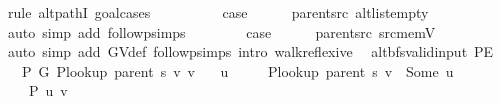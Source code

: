 \begin{isabellebody}
%
\endisadelimproof
%
\isatagproof
{}\isamarkupfalse%
\ {\isacharparenleft}{\kern0pt}rule\ alt{\isacharunderscore}{\kern0pt}pathI{\isacharcomma}{\kern0pt}\ goal{\isacharunderscore}{\kern0pt}cases{\isacharparenright}{\kern0pt}\isanewline
\ \ \isamarkupfalse%
\ {}\isanewline
\ \ \isamarkupfalse%
\ \isamarkupfalse%
\ {\isacharquery}{\kern0pt}case\isanewline
\ \ \ \ \isamarkupfalse%
\ parent{\isacharunderscore}{\kern0pt}src\ alt{\isacharunderscore}{\kern0pt}list{\isacharunderscore}{\kern0pt}empty\isanewline
\ \ \ \ \isamarkupfalse%
\ {\isacharparenleft}{\kern0pt}auto\ simp\ add{\isacharcolon}{\kern0pt}\ follow{\isacharunderscore}{\kern0pt}psimps{\isacharparenright}{\kern0pt}\isanewline
{}\isamarkupfalse%
\isanewline
\ \ \isamarkupfalse%
\ {}\isanewline
\ \ \isamarkupfalse%
\ {\isacharquery}{\kern0pt}case\isanewline
\ \ \ \ \isamarkupfalse%
\ parent{\isacharunderscore}{\kern0pt}src\ src{\isacharunderscore}{\kern0pt}mem{\isacharunderscore}{\kern0pt}V\isanewline
\ \ \ \ \isamarkupfalse%
\ {\isacharparenleft}{\kern0pt}auto\ simp\ add{\isacharcolon}{\kern0pt}\ G{\isachardot}{\kern0pt}V{\isacharunderscore}{\kern0pt}def\ follow{\isacharunderscore}{\kern0pt}psimps\ intro{\isacharcolon}{\kern0pt}\ walk{\isacharunderscore}{\kern0pt}reflexive{\isacharparenright}{\kern0pt}\isanewline
{}\isamarkupfalse%
%
\endisatagproof
{\isafoldproof}%
%
\isadelimproof
\isanewline
%
\endisadelimproof
%
\isadeliminvisible
\isanewline
%
\endisadeliminvisible
%
\isataginvisible
{}\isamarkupfalse%
\ {\isacharparenleft}{\kern0pt}\ alt{\isacharunderscore}{\kern0pt}bfs{\isacharunderscore}{\kern0pt}valid{\isacharunderscore}{\kern0pt}input{\isacharparenright}{\kern0pt}\ P{\isacharprime}{\kern0pt}E{\isacharcolon}{\kern0pt}\isanewline
\ \ \ {\isachardoublequoteopen}P{\isacharprime}{\kern0pt}\ G{}\ {\isacharparenleft}{\kern0pt}P{\isacharunderscore}{\kern0pt}lookup\ {\isacharparenleft}{\kern0pt}parent\ s{\isacharparenright}{\kern0pt}\ v{\isacharparenright}{\kern0pt}\ v{\isachardoublequoteclose}\isanewline
\ \ \ u\ \isanewline
\ \ \ \ {\isachardoublequoteopen}P{\isacharunderscore}{\kern0pt}lookup\ {\isacharparenleft}{\kern0pt}parent\ s{\isacharparenright}{\kern0pt}\ v\ {\isacharequal}{\kern0pt}\ Some\ u{\isachardoublequoteclose}\isanewline
\ \ \ \ {\isachardoublequoteopen}P{\isacharprime}{\kern0pt}{\isacharprime}{\kern0pt}\ {\isacharbraceleft}{\kern0pt}u{\isacharcomma}{\kern0pt}\ v{\isacharbraceright}{\kern0pt}{\isachardoublequoteclose}%

\end{isabellebody}
